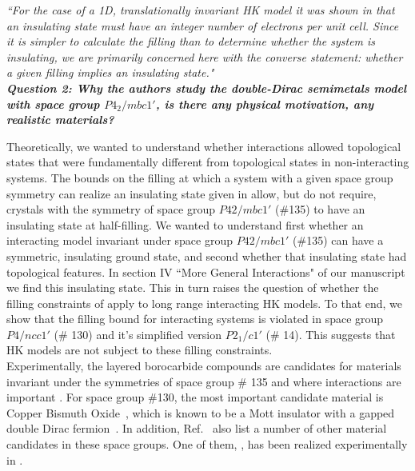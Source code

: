 \documentclass[aps,reprint,notitlepage,onecolumn,12pt]{revtex4-2}
\numberwithin{equation}{section}
\begin{document}
\textit{``For the case of a 1D, translationally invariant HK model it was shown in \cite{lsmyin2022} that an insulating state must have an integer number of electrons per unit cell. Since it is simpler to calculate the filling than to determine whether the system is insulating, we are primarily concerned here with the converse statement: whether a given filling implies an insulating state."}\\


\textbf{\textit{Question 2: Why the authors study the double-Dirac semimetals model with space group $P4_2/mbc1'$, is there any physical motivation, any realistic materials?}}


Theoretically, we wanted to understand whether interactions allowed topological states that were fundamentally different from topological states in non-interacting systems. The bounds on the filling at which a system with a given space group symmetry can realize an insulating state given in \cite{watanabe2015filling} allow, but do not require, crystals with the symmetry of space group $P42/mbc1'$ (\#135) to have an insulating state at half-filling. We wanted to understand first whether an interacting model invariant under space group $P42/mbc1'$ (\#135) can have a symmetric, insulating ground state, and second whether that insulating state had topological features. In section IV ``More General Interactions" of our manuscript we find this insulating state. This in turn raises the question of whether the filling constraints of \cite{watanabe2015filling} apply to long range interacting HK models. To that end, we show that the filling bound for interacting systems is violated in space group $P4/ncc1'$ (\# 130) and it's simplified version $P2_1/c1'$ (\# 14). This suggests that HK models are not subject to these filling constraints. \\


\indent Experimentally, the layered borocarbide compounds are candidates for materials invariant under the symmetries of space group \# 135 and where interactions are important \cite{wiitkarborocarbide1994}. 
For space group \#130, the most important candidate material is Copper Bismuth Oxide~\cite{bradlyn2016dirac}, which is known to be a Mott insulator with a gapped double Dirac fermion~\cite{disante2017realizing}. In addition, Ref.~\cite{bradlyn2016dirac} also list a number of other material candidates in these space groups.
One of them, , has been realized experimentally in \cite{2017candidate130}.\\
\end{document}
